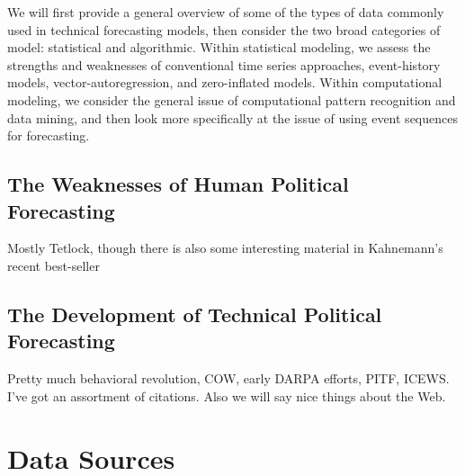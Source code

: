 \documentclass[graybox]{svmult}
\begin{document}
We will first provide a general overview of some of the types of data commonly used in technical forecasting models, then consider the two broad categories of model: statistical and algorithmic. {\color{blue}{[next sentences will be updated when manuscript is complete]}}Within statistical modeling, we assess the strengths and weaknesses of conventional time series approaches, event-history models, vector-autoregression, and zero-inflated models. Within computational modeling, we consider the general issue of computational pattern recognition and data mining, and then look more specifically at the issue of using event sequences for forecasting. 

\subsection{The Weaknesses of Human Political Forecasting}
\label{subsec:human}

Mostly Tetlock, though there is also some interesting material in Kahnemann's recent best-seller  

\subsection{The Development of Technical Political Forecasting}
\label{subsec:TPF}

Pretty much behavioral revolution, COW, early DARPA efforts, PITF, ICEWS. I've got an assortment of citations. Also we will say nice things about the Web.




\section{Data Sources}
\label{sec:data}
\end{document}
